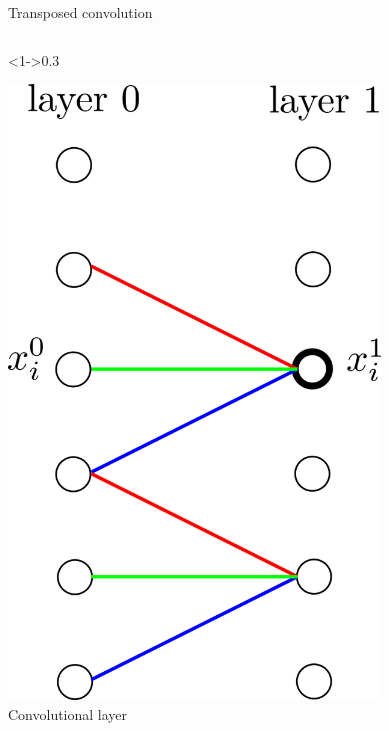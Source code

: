 \documentclass[xcolor=pdftex,dvipsnames,table,mathserif]{beamer}
\begin{document}
\begin{frame}{Transposed convolution}

  \begin{columns}

    \begin{column}<1->{0.3\textwidth}
      \begin{center}
        \includegraphics[width=0.74\textwidth]{convolutional_layer}
        \\ \scriptsize{Convolutional layer}
      \end{center}
    \end{column}


\end{columns}
\end{frame}
\end{document}
